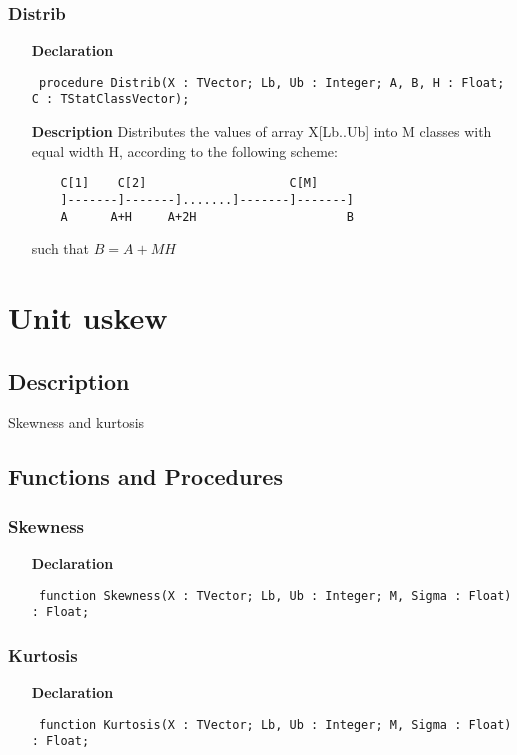 \documentclass[12pt,a4paper,oneside]{report}
\newcommand{\declarationitem}[1]{\textbf{#1}}
\newcommand{\descriptiontitle}[1]{\textbf{#1}}
\newcommand{\code}[1]{\texttt{#1}}
\begin{document}
\subsubsection{Distrib}
\label{udistrib-Distrib}
\begin{itemize}\item[\declarationitem{Declaration}\hfill]
	\begin{flushleft}
		\code{
			procedure Distrib(X : TVector; Lb, Ub : Integer; A, B, H : Float; C : TStatClassVector);}
	\end{flushleft}
	\item[\descriptiontitle{Description}]
	Distributes the values of array X[Lb..Ub] into M classes with equal width H, according to the following scheme:
	\begin{verbatim}
	C[1]    C[2]                    C[M]
	]-------]-------].......]-------]-------]
	A      A+H     A+2H                     B
	\end{verbatim}	
	such that $ B = A + M H$
	
\end{itemize}
\section{Unit uskew}
\label{uskew}
\subsection{Description}
Skewness and kurtosis
\subsection{Functions and Procedures}
\subsubsection{Skewness}
\label{uskew-Skewness}
\begin{itemize}\item[\declarationitem{Declaration}\hfill]
	\begin{flushleft}
		\code{
			function Skewness(X : TVector; Lb, Ub : Integer; M, Sigma : Float) : Float;}
	\end{flushleft}
\end{itemize}
\subsubsection{Kurtosis}
\label{uskew-Kurtosis}
\begin{itemize}\item[\declarationitem{Declaration}\hfill]
	\begin{flushleft}
		\code{
			function Kurtosis(X : TVector; Lb, Ub : Integer; M, Sigma : Float) : Float;}
	\end{flushleft}
\end{itemize}
\end{document}
